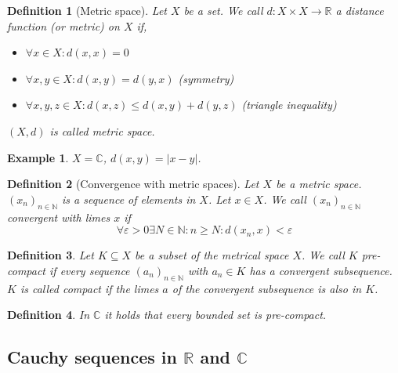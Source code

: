 \documentclass[a4paper,landscape,twocolumn]{article}
\newtheorem{defi}{Definition}
\newtheorem{ex}{Example}
\newcommand\abs[1]{\left|#1\right|}
\newcommand\seq[1]{{\left(#1\right)}_{n \in \mathbb N}}
\begin{document}
\begin{defi}[Metric space]
  Let $X$ be a set. We call $d: X \times X \rightarrow \mathbb R$ a \emph{distance function} (or \emph{metric}) on $X$ if,
  \begin{itemize}
    \item $\forall x \in X: d(x, x) = 0$
    \item $\forall x,y \in X: d(x, y) = d(y, x)$ (symmetry)
    \item $\forall x,y,z \in X: d(x,z) \leq d(x,y) + d(y,z)$ (triangle inequality)
  \end{itemize}
  $(X, d)$ is called \emph{metric space}.
\end{defi}
\begin{ex}
  $X = \mathbb C$, $d(x, y) = \abs{x - y}$.
\end{ex}

\begin{defi}[Convergence with metric spaces]
  Let $X$ be a metric space. $(x_n)_{n \in \mathbb N}$ is a sequence of elements in $X$.
  Let $x \in X$. We call $\seq{x_n}$ convergent with limes $x$ if
  \[ \forall \varepsilon > 0 \exists N \in \mathbb N: n \geq N: d(x_n, x) < \varepsilon \]
\end{defi}


\begin{defi}
  Let $K \subseteq X$ be a subset of the metrical space $X$. We call $K$ \emph{pre-compact}
  if every sequence $\seq{a_n}$ with $a_n \in K$ has a convergent subsequence.
  $K$ is called compact if the limes $a$ of the convergent subsequence is also in $K$.
\end{defi}

\begin{defi}
  In $\mathbb C$ it holds that every bounded set is pre-compact.
\end{defi}

\subsection{Cauchy sequences in $\mathbb R$ and $\mathbb C$}
%
\end{document}
